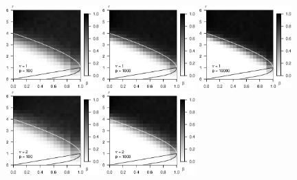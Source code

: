 \begin{figure}
      \centering
      \includegraphics[width=0.32\textwidth]{./sim_strong_boundary/simulated_phase_diagram_chi-squared_nu1_p100.eps}
      \includegraphics[width=0.32\textwidth]{./sim_strong_boundary/simulated_phase_diagram_chi-squared_nu1_p1000.eps}
      \includegraphics[width=0.32\textwidth]{./sim_strong_boundary/simulated_phase_diagram_chi-squared_nu1_p10000.eps}
      \includegraphics[width=0.32\textwidth]{./sim_strong_boundary/simulated_phase_diagram_chi-squared_nu2_p100.eps}
      \includegraphics[width=0.32\textwidth]{./sim_strong_boundary/simulated_phase_diagram_chi-squared_nu2_p1000.eps}

\end{figure}
